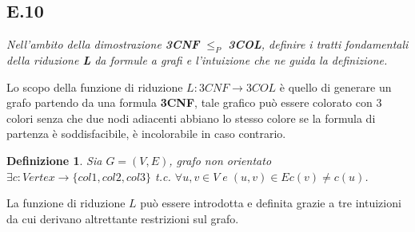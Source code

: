 \documentclass[a4paper]{article}
\newtheorem*{definition}{Definizione}
\begin{document}
\subsection{E.10}
\emph{Nell’ambito della dimostrazione \textbf{3CNF} $\leq_P$ \textbf{3COL}, definire i tratti fondamentali della riduzione \textbf{L} da formule a grafi e l’intuizione che ne guida la definizione.}


Lo scopo della funzione di riduzione $L : 3CNF \rightarrow 3COL$ è quello di generare un grafo partendo da una formula \textbf{3CNF}, tale grafico può essere colorato con 3 colori senza che due nodi adiacenti abbiano lo stesso colore se la formula di partenza è soddisfacibile, è incolorabile in caso contrario.
\begin{definition}Sia $G = (V,E)$, grafo non orientato $\exists c : Vertex \rightarrow \{col1,col2,col3\}$ t.c. $\forall u,v \in V \; e \; (u,v) \in E c(v) \neq c(u)$.
\end{definition}
La funzione di riduzione $L$ può essere introdotta e definita grazie a tre intuizioni da cui derivano altrettante restrizioni sul grafo.
\end{document}
